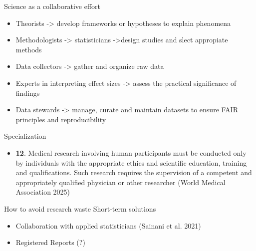 \documentclass[
  ignorenonframetext,
]{beamer}
\providecommand{\tightlist}{%
  \setlength{\itemsep}{0pt}\setlength{\parskip}{0pt}}
\begin{document}
\begin{frame}{Science as a collaborative effort}
\protect{}\label{science-as-a-collaborative-effort-1}
\begin{itemize}
\tightlist
\item
  Theorists -\textgreater{} develop frameworks or hypotheses to explain
  phenomena
\item
  Methodologists -\textgreater{} statisticians -\textgreater design
  studies and slect appropiate methods
\item
  Data collectors -\textgreater{} gather and organize raw data
\item
  Experts in interpreting effect sizes -\textgreater{} assess the
  practical significance of findings
\item
  Data stewards -\textgreater{} manage, curate and maintain datasets to
  ensure FAIR principles and reproducibility
\end{itemize}
\end{frame}

\begin{frame}{Specialization}
\protect{}\label{specialization}
\begin{itemize}
\tightlist
\item
  \textbf{12}. Medical research involving human participants must be
  conducted only by individuals with the appropriate ethics and
  scientific education, training and qualifications. Such research
  requires the supervision of a competent and appropriately qualified
  physician or other researcher (World Medical Association 2025)
\end{itemize}
\end{frame}

\begin{frame}{How to avoid research waste}
\protect{}\label{how-to-avoid-research-waste-2}
Short-term solutions

\begin{itemize}
\item
  Collaboration with applied statisticians (Sainani et al. 2021)
\item
  Registered Reports (?)
\end{itemize}
\end{frame}
\end{document}
